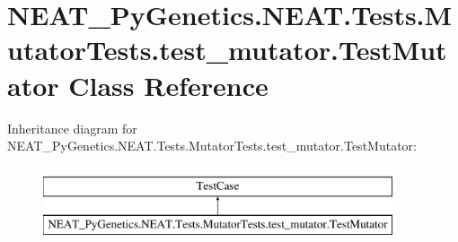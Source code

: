 \hypertarget{class_n_e_a_t___py_genetics_1_1_n_e_a_t_1_1_tests_1_1_mutator_tests_1_1test__mutator_1_1_test_mutator}{}\section{N\+E\+A\+T\+\_\+\+Py\+Genetics.\+N\+E\+A\+T.\+Tests.\+Mutator\+Tests.\+test\+\_\+mutator.\+Test\+Mutator Class Reference}
\label{class_n_e_a_t___py_genetics_1_1_n_e_a_t_1_1_tests_1_1_mutator_tests_1_1test__mutator_1_1_test_mutator}
Inheritance diagram for N\+E\+A\+T\+\_\+\+Py\+Genetics.\+N\+E\+A\+T.\+Tests.\+Mutator\+Tests.\+test\+\_\+mutator.\+Test\+Mutator\+:\begin{figure}[H]
\begin{center}
\leavevmode
\includegraphics[height=2.000000cm]{class_n_e_a_t___py_genetics_1_1_n_e_a_t_1_1_tests_1_1_mutator_tests_1_1test__mutator_1_1_test_mutator}
\end{center}
\end{figure}
